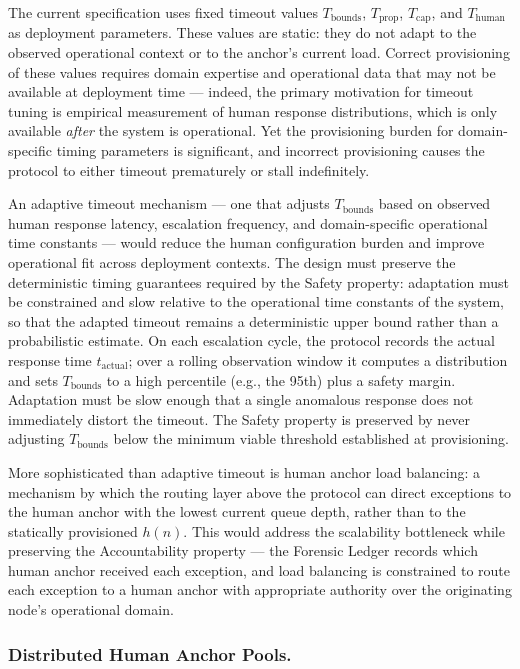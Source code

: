 The current specification uses fixed timeout values $T_{\mathrm{bounds}}$, $T_{\mathrm{prop}}$, $T_{\mathrm{cap}}$, and $T_{\mathrm{human}}$ as deployment parameters. These values are static: they do not adapt to the observed operational context or to the anchor's current load. Correct provisioning of these values requires domain expertise and operational data that may not be available at deployment time --- indeed, the primary motivation for timeout tuning is empirical measurement of human response distributions, which is only available \emph{after} the system is operational. Yet the provisioning burden for domain-specific timing parameters is significant, and incorrect provisioning causes the protocol to either timeout prematurely or stall indefinitely.

An adaptive timeout mechanism --- one that adjusts $T_{\mathrm{bounds}}$ based on observed human response latency, escalation frequency, and domain-specific operational time constants --- would reduce the human configuration burden and improve operational fit across deployment contexts. The design must preserve the deterministic timing guarantees required by the Safety property: adaptation must be constrained and slow relative to the operational time constants of the system, so that the adapted timeout remains a deterministic upper bound rather than a probabilistic estimate. On each escalation cycle, the protocol records the actual response time $t_{\mathrm{actual}}$; over a rolling observation window it computes a distribution and sets $T_{\mathrm{bounds}}$ to a high percentile (e.g., the 95th) plus a safety margin. Adaptation must be slow enough that a single anomalous response does not immediately distort the timeout. The Safety property is preserved by never adjusting $T_{\mathrm{bounds}}$ below the minimum viable threshold established at provisioning.

More sophisticated than adaptive timeout is human anchor load balancing: a mechanism by which the routing layer above the protocol can direct exceptions to the human anchor with the lowest current queue depth, rather than to the statically provisioned $h(n)$. This would address the scalability bottleneck while preserving the Accountability property --- the Forensic Ledger records which human anchor received each exception, and load balancing is constrained to route each exception to a human anchor with appropriate authority over the originating node's operational domain.

\subsubsection{Distributed Human Anchor Pools.}

